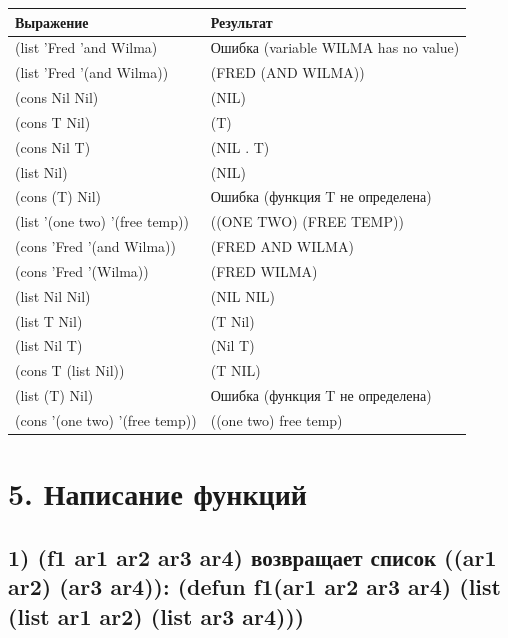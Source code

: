 \documentclass[a4paper,12pt]{article}
\begin{document}
	\begin{table} [h!]
		\begin{center}
			\begin{tabular}{|l|l|}
				\hline
				{\bf  Выражение} &    {\bf Результат} \\
				\hline
				{ (list 'Fred 'and Wilma)}& Ошибка (variable WILMA has no value)\\
				\hline
				{(list 'Fred '(and Wilma))}& (FRED (AND WILMA))\\
				\hline
				{(cons Nil Nil)}& (NIL)\\
				\hline
				{(cons T Nil)}& (T)\\
				\hline
				{(cons Nil T)}& (NIL . T)\\
				\hline
				{(list Nil)}& (NIL)\\
				\hline
				{(cons (T) Nil)}& Ошибка (функция T не определена)\\
				\hline
				{(list '(one two) '(free temp))}& ((ONE TWO) (FREE TEMP))\\
				\hline
				{(cons 'Fred '(and Wilma))}& (FRED AND WILMA)\\
				\hline
				{(cons 'Fred '(Wilma))}& (FRED WILMA)\\
				\hline
				{(list Nil Nil)}& (NIL NIL)\\
				\hline
				{(list T Nil)}& (T Nil)\\
				\hline
				{(list Nil T)}& (Nil T)\\
				\hline
				{(cons T (list Nil))}& (T NIL)\\
				\hline
				{(list (T) Nil)}& Ошибка (функция T не определена)\\
				\hline
				{(cons '(one two) '(free temp))}& ((one two) free temp)\\
				\hline
			\end{tabular}  
			\label{m2}
		\end{center}
	\end{table}

\newpage
	
	\section*{5. Написание функций}
	
	\subsection*{ 1) (f1 ar1 ar2 ar3 ar4) возвращает список ((ar1 ar2) (ar3 ar4)): (defun f1(ar1 ar2 ar3 ar4) (list (list ar1 ar2) (list ar3 ar4)))}
	
\end{document}
